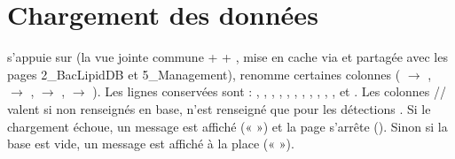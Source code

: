 \documentclass[letterpaper,10pt,english]{sphinxmanual}
\begin{document}
\section{Chargement des données}
\label{\detokenize{3_Export:chargement-des-donnees}}
\sphinxAtStartPar
{} s’appuie sur  (la vue jointe
commune  +  + , mise en cache via 
et partagée avec les pages 2\_BacLipidDB et 5\_Management), renomme certaines colonnes ( \(\rightarrow\) ,
 \(\rightarrow\) ,  \(\rightarrow\) ,  \(\rightarrow\) ). Les lignes conservées sont :
, , , , , , , , , , ,  et
. Les colonnes // valent  si non renseignés en base,  n’est renseigné que pour les détections . Si le chargement échoue, un message  est affiché
(«  ») et la page s’arrête (). Sinon si la base est vide, un message  est affiché à la place («  »).
\end{document}
